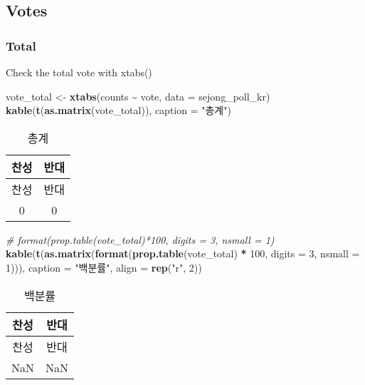 \documentclass[
]{article}
\newenvironment{Shaded}{\begin{snugshade}}{\end{snugshade}}
\newcommand{\CommentTok}[1]{\textcolor[rgb]{0.56,0.35,0.01}{\textit{#1}}}
\newcommand{\DataTypeTok}[1]{\textcolor[rgb]{0.13,0.29,0.53}{#1}}
\newcommand{\DecValTok}[1]{\textcolor[rgb]{0.00,0.00,0.81}{#1}}
\newcommand{\KeywordTok}[1]{\textcolor[rgb]{0.13,0.29,0.53}{\textbf{#1}}}
\newcommand{\NormalTok}[1]{#1}
\newcommand{\OperatorTok}[1]{\textcolor[rgb]{0.81,0.36,0.00}{\textbf{#1}}}
\newcommand{\StringTok}[1]{\textcolor[rgb]{0.31,0.60,0.02}{#1}}
\begin{document}
\hypertarget{votes}{%
\subsection{Votes}\label{votes}}

\hypertarget{total}{%
\subsubsection{Total}\label{total}}

Check the total vote with xtabs()

\begin{Shaded}
\begin{Highlighting}[]
\NormalTok{vote\_total \textless{}{-}}\StringTok{ }\KeywordTok{xtabs}\NormalTok{(counts }\OperatorTok{\textasciitilde{}}\StringTok{ }\NormalTok{vote, }
                    \DataTypeTok{data =}\NormalTok{ sejong\_poll\_kr)}
\KeywordTok{kable}\NormalTok{(}\KeywordTok{t}\NormalTok{(}\KeywordTok{as.matrix}\NormalTok{(vote\_total)), }
      \DataTypeTok{caption =} \StringTok{"총계"}\NormalTok{)}
\end{Highlighting}
\end{Shaded}

\begin{longtable}[]{@{}cc@{}}
\caption{총계}\tabularnewline
\toprule
찬성 & 반대\tabularnewline
\midrule
\endfirsthead
\toprule
찬성 & 반대\tabularnewline
\midrule
\endhead
0 & 0\tabularnewline
\bottomrule
\end{longtable}

\begin{Shaded}
\begin{Highlighting}[]
\CommentTok{\# format(prop.table(vote\_total)*100, digits = 3, nsmall = 1)}
\KeywordTok{kable}\NormalTok{(}\KeywordTok{t}\NormalTok{(}\KeywordTok{as.matrix}\NormalTok{(}\KeywordTok{format}\NormalTok{(}\KeywordTok{prop.table}\NormalTok{(vote\_total) }\OperatorTok{*}\StringTok{ }\DecValTok{100}\NormalTok{, }
                         \DataTypeTok{digits =} \DecValTok{3}\NormalTok{, }\DataTypeTok{nsmall =} \DecValTok{1}\NormalTok{))), }
      \DataTypeTok{caption =} \StringTok{"백분률"}\NormalTok{, }
      \DataTypeTok{align =} \KeywordTok{rep}\NormalTok{(}\StringTok{"r"}\NormalTok{, }\DecValTok{2}\NormalTok{))}
\end{Highlighting}
\end{Shaded}

\begin{longtable}[]{@{}cc@{}}
\caption{백분률}\tabularnewline
\toprule
찬성 & 반대\tabularnewline
\midrule
\endfirsthead
\toprule
찬성 & 반대\tabularnewline
\midrule
\endhead
NaN & NaN\tabularnewline
\bottomrule
\end{longtable}
\end{document}
